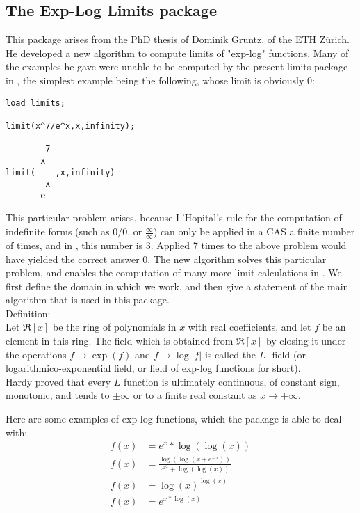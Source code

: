 

\subsection{The Exp-Log Limits package}
This package  arises from the PhD thesis of Dominik Gruntz, of the ETH  Z\"{u}rich. He developed a new algorithm to compute limits of "exp-log" functions. Many of the examples he gave were unable to be computed by the present limits package in \REDUCE, the simplest example being the following, whose limit is obviously $0$:
\begin{verbatim}
load limits;

limit(x^7/e^x,x,infinity);

        7
       x
limit(----,x,infinity)
        x
       e
\end{verbatim}

This particular problem arises, because L'Hopital's rule for the computation of indefinite forms (such as $0/0$, or $\frac{\infty}{\infty}$) can only be applied in a CAS a finite number of times, and in \REDUCE, this number is 3. Applied 7 times to the above problem would have yielded the correct answer 0. 
The new algorithm solves this particular problem, and enables the computation of many more limit calculations in \REDUCE. We first define the domain in which we work, and then give a statement of the main algorithm that is used in this package. \\[\baselineskip]
Definition: \\
Let $\Re[x]$ be the ring of polynomials in $x$ with real coefficients, and let $f$ be an element in this ring. The field which is obtained from $\Re[x]$ by closing it under the operations $f\rightarrow\exp(f)$ and $f\rightarrow\log |f|$ is called the $L$- field (or logarithmico-exponential field, or field of exp-log functions for short).
\\[\baselineskip]
Hardy proved that every $L$ function is ultimately continuous, of constant sign, monotonic, and tends to $\pm \infty$ or to a finite real constant as $x\rightarrow +\infty.$

Here are some examples of exp-log functions, which the package is able to deal with: 
\begin{align*}
 f(x) &=e^{x}*\log(\log(x)) \\[2mm]
 f(x) &=\frac{\log(\log(x+e^{-x}))}{e^{x^{2}}+\log(\log(x))}  \\[2mm]
 f(x) &=\log(x)^{\log(x)}  \\[2mm]
 f(x) &=e^{x*\log(x)} 
\end{align*}

